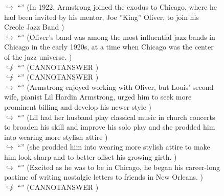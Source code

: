 \documentclass[11pt,a4paper, onecolumn]{article}
\begin{document}
\begin{figure}[t] \small \begin{tcolorbox}[boxsep=0pt,left=5pt,right=0pt,top=2pt,colback = yellow!5] \begin{dialogue}
 \small 
\colorbox{pink!25}{$\hookrightarrow$}
{ ``'' (In 1922, Armstrong joined the exodus to Chicago, where he had been invited by his mentor, Joe ''King'' Oliver, to join his Creole Jazz Band ) }
\\
\colorbox{pink!25}{$\hookrightarrow$}
{ ``'' (Oliver's band was among the most influential jazz bands in Chicago in the early 1920s, at a time when Chicago was the center of the jazz universe. ) }
\\
\colorbox{pink!25}{$\not\hookrightarrow$}
{ ``'' (CANNOTANSWER ) }
\\
\colorbox{pink!25}{$\not\hookrightarrow$}
{ ``'' (CANNOTANSWER ) }
\\
\colorbox{pink!25}{$\hookrightarrow$}
{ ``'' (Armstrong enjoyed working with Oliver, but Louis' second wife, pianist Lil Hardin Armstrong, urged him to seek more prominent billing and develop his newer style ) }
\\
\colorbox{pink!25}{$\hookrightarrow$}
{ ``'' (Lil had her husband play classical music in church concerts to broaden his skill and improve his solo play and she prodded him into wearing more stylish attire ) }
\\
\colorbox{pink!25}{$\hookrightarrow$}
{ ``'' (she prodded him into wearing more stylish attire to make him look sharp and to better offset his growing girth. ) }
\\
\colorbox{pink!25}{$\hookrightarrow$}
{ ``'' (Excited as he was to be in Chicago, he began his career-long pastime of writing nostalgic letters to friends in New Orleans. ) }
\\
\colorbox{pink!25}{$\not\hookrightarrow$}
{ ``'' (CANNOTANSWER ) }
\\
 \end{dialogue}\end{tcolorbox}\end{figure}
\end{document}
